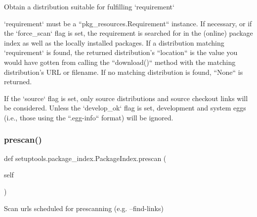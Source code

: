 \begin{DoxyVerb}Obtain a distribution suitable for fulfilling `requirement`

`requirement` must be a ``pkg_resources.Requirement`` instance.
If necessary, or if the `force_scan` flag is set, the requirement is
searched for in the (online) package index as well as the locally
installed packages.  If a distribution matching `requirement` is found,
the returned distribution's ``location`` is the value you would have
gotten from calling the ``download()`` method with the matching
distribution's URL or filename.  If no matching distribution is found,
``None`` is returned.

If the `source` flag is set, only source distributions and source
checkout links will be considered.  Unless the `develop_ok` flag is
set, development and system eggs (i.e., those using the ``.egg-info``
format) will be ignored.
\end{DoxyVerb}
 \mbox{\label{classsetuptools_1_1package__index_1_1_package_index_a65d775034e7b39ede1a15be9cc17e1aa}} 
\subsubsection{\texorpdfstring{prescan()}{prescan()}}
{\footnotesize\ttfamily def setuptools.\+package\+\_\+index.\+Package\+Index.\+prescan (\begin{DoxyParamCaption}\item[{}]{self }\end{DoxyParamCaption})}

\begin{DoxyVerb}Scan urls scheduled for prescanning (e.g. --find-links)\end{DoxyVerb}
 \mbox{\label{classsetuptools_1_1package__index_1_1_package_index_a1ae14e5edd4b4c1a585aec3eb9022de0}} 
